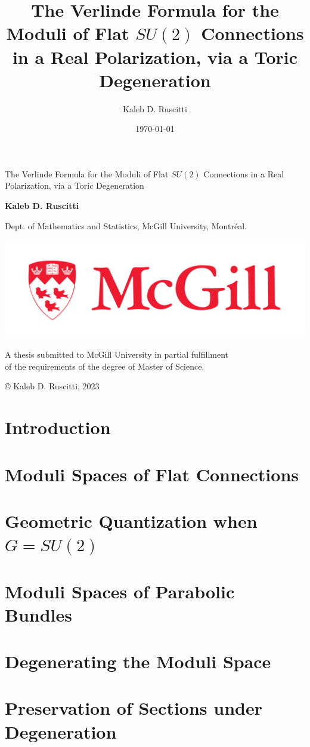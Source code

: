 \documentclass[]{report}
\title{The Verlinde Formula for the Moduli of Flat $SU(2)$ Connections in a Real Polarization, via a Toric Degeneration}
\date{\today}
\author{Kaleb D. Ruscitti}
\numberwithin{theorem}{chapter}
\begin{document}
	
\begin{titlepage}
	\begin{center}
		\vspace*{1cm}
		
		{\Large The Verlinde Formula for the Moduli of Flat $SU(2)$ Connections in a Real Polarization, via a Toric Degeneration}
		
		\vspace{2cm}
		\textbf{Kaleb D. Ruscitti}
		
		\vspace{0.5 cm}
		Dept. of Mathematics and Statistics, McGill University, Montréal.
		
		\vfill
		
		\includegraphics{mcgill_sig_red.png}
	
		
		A thesis submitted to McGill University in partial fulfillment \\
		 of the requirements of the degree of Master of Science.
		
		\vspace{0.5 cm}
		{\footnotesize © Kaleb D. Ruscitti, 2023}
	\end{center}
\end{titlepage}
\tableofcontents



\chapter{Introduction}
\label{s:intro}

\chapter{Moduli Spaces of Flat Connections}
\label{s:background}

\chapter{Geometric Quantization when $G=SU(2)$}
\label{s:jeffreyweitsman}

\chapter{Moduli Spaces of Parabolic Bundles}
\label{s:mastermoduli}

\chapter{Degenerating the Moduli Space}
\label{s:degeneration}

\chapter{Preservation of Sections under Degeneration}
\label{s:result}


\pagebreak
\printbibliography
\end{document}
